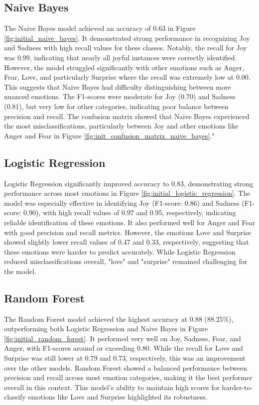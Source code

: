 \clearpage

\subsection{Naive Bayes}
The Naive Bayes model achieved an accuracy of 0.63 in Figure \ref{fig:initial_naive_bayes}. It demonstrated strong performance in recognizing Joy and Sadness with high recall values for these classes. Notably, the recall for Joy was 0.99, indicating that nearly all joyful instances were correctly identified. However, the model struggled significantly with other emotions such as Anger, Fear, Love, and particularly Surprise where the recall was extremely low at 0.00. This suggests that Naive Bayes had difficulty distinguishing between more nuanced emotions. The F1-scores were moderate for Joy (0.70) and Sadness (0.81), but very low for other categories, indicating poor balance between precision and recall. The confusion matrix showed that Naive Bayes experienced the most misclassifications, particularly between Joy and other emotions like Anger and Fear in Figure \ref{fig:init_confusion_matrix_naive_bayes}."

\subsection{Logistic Regression}
Logistic Regression significantly improved accuracy to 0.83, demonstrating strong performance across most emotions in Figure \ref{fig:initial_logistic_regression}. The model was especially effective in identifying Joy (F1-score: 0.86) and Sadness (F1-score: 0.90), with high recall values of 0.97 and 0.95, respectively, indicating reliable identification of these emotions. It also performed well for Anger and Fear with good precision and recall metrics. However, the emotions Love and Surprise showed slightly lower recall values of 0.47 and 0.33, respectively, suggesting that these emotions were harder to predict accurately. While Logistic Regression reduced misclassifications overall, "love" and "surprise" remained challenging for the model.

\subsection{Random Forest}
The Random Forest model achieved the highest accuracy at 0.88 (88.25\%), outperforming both Logistic Regression and Naive Bayes in Figure \ref{fig:initial_random_forest}. It performed very well on Joy, Sadness, Fear, and Anger, with F1-scores around or exceeding 0.80. While the recall for Love and Surprise was still lower at 0.79 and 0.73, respectively, this was an improvement over the other models. Random Forest showed a balanced performance between precision and recall across most emotion categories, making it the best performer overall in this context. This model's ability to maintain high scores for harder-to-classify emotions like Love and Surprise highlighted its robustness.

